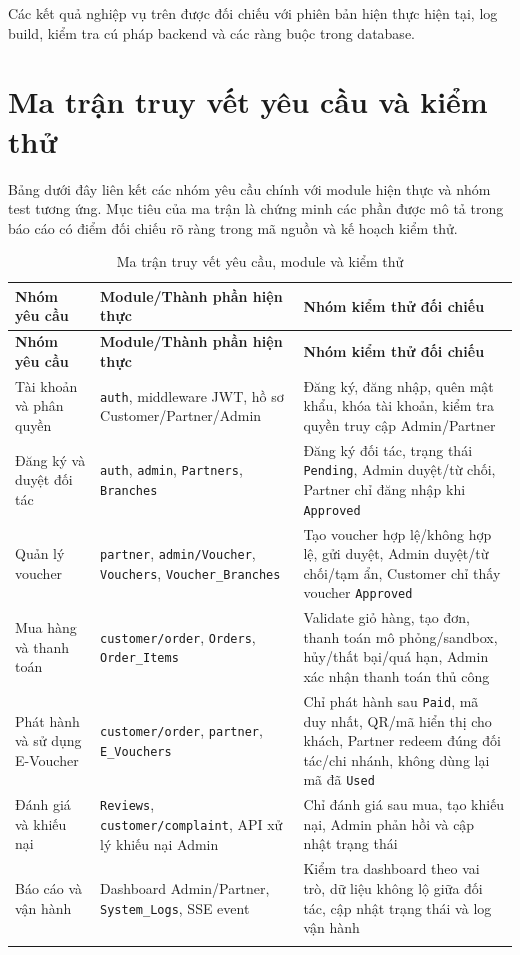 Các kết quả nghiệp vụ trên được đối chiếu với phiên bản hiện thực hiện tại, log build, kiểm tra cú pháp backend và các ràng buộc trong database.

\section{Ma trận truy vết yêu cầu và kiểm thử}

Bảng dưới đây liên kết các nhóm yêu cầu chính với module hiện thực và nhóm test tương ứng. Mục tiêu của ma trận là chứng minh các phần được mô tả trong báo cáo có điểm đối chiếu rõ ràng trong mã nguồn và kế hoạch kiểm thử.

\begin{longtable}{|p{3.4cm}|p{4.4cm}|p{5.0cm}|}
\hline
\textbf{Nhóm yêu cầu} & \textbf{Module/Thành phần hiện thực} & \textbf{Nhóm kiểm thử đối chiếu} \\ \hline
\endfirsthead
\hline
\textbf{Nhóm yêu cầu} & \textbf{Module/Thành phần hiện thực} & \textbf{Nhóm kiểm thử đối chiếu} \\ \hline
\endhead
Tài khoản và phân quyền & \texttt{auth}, middleware JWT, hồ sơ Customer/Partner/Admin & Đăng ký, đăng nhập, quên mật khẩu, khóa tài khoản, kiểm tra quyền truy cập Admin/Partner \\ \hline
Đăng ký và duyệt đối tác & \texttt{auth}, \texttt{admin}, \texttt{Partners}, \texttt{Branches} & Đăng ký đối tác, trạng thái \texttt{Pending}, Admin duyệt/từ chối, Partner chỉ đăng nhập khi \texttt{Approved} \\ \hline
Quản lý voucher & \texttt{partner}, \texttt{admin/Voucher}, \texttt{Vouchers}, \texttt{Voucher\_Branches} & Tạo voucher hợp lệ/không hợp lệ, gửi duyệt, Admin duyệt/từ chối/tạm ẩn, Customer chỉ thấy voucher \texttt{Approved} \\ \hline
Mua hàng và thanh toán & \texttt{customer/order}, \texttt{Orders}, \texttt{Order\_Items} & Validate giỏ hàng, tạo đơn, thanh toán mô phỏng/sandbox, hủy/thất bại/quá hạn, Admin xác nhận thanh toán thủ công \\ \hline
Phát hành và sử dụng E-Voucher & \texttt{customer/order}, \texttt{partner}, \texttt{E\_Vouchers} & Chỉ phát hành sau \texttt{Paid}, mã duy nhất, QR/mã hiển thị cho khách, Partner redeem đúng đối tác/chi nhánh, không dùng lại mã đã \texttt{Used} \\ \hline
Đánh giá và khiếu nại & \texttt{Reviews}, \texttt{customer/complaint}, API xử lý khiếu nại Admin & Chỉ đánh giá sau mua, tạo khiếu nại, Admin phản hồi và cập nhật trạng thái \\ \hline
Báo cáo và vận hành & Dashboard Admin/Partner, \texttt{System\_Logs}, SSE event & Kiểm tra dashboard theo vai trò, dữ liệu không lộ giữa đối tác, cập nhật trạng thái và log vận hành \\ \hline
\caption[]{Ma trận truy vết yêu cầu, module và kiểm thử}\\
\end{longtable}

